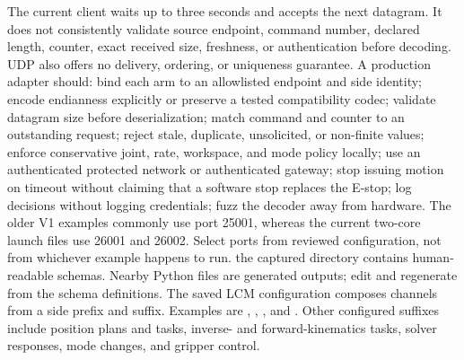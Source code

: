 {}The current client waits up to three seconds and accepts the next datagram. It does not consistently validate source endpoint, command number, declared length, counter, exact received size, freshness, or authentication before decoding. UDP also offers no delivery, ordering, or uniqueness guarantee.\markdownRendererParagraphSeparator
{}A production adapter should:\markdownRendererInterblockSeparator
{}\markdownRendererOlBegin
{}bind each arm to an allowlisted endpoint and side identity;\markdownRendererOlItemEnd 
{}encode endianness explicitly or preserve a tested compatibility codec;\markdownRendererOlItemEnd 
{}validate datagram size before deserialization;\markdownRendererOlItemEnd 
{}match command and counter to an outstanding request;\markdownRendererOlItemEnd 
{}reject stale, duplicate, unsolicited, or non-finite values;\markdownRendererOlItemEnd 
{}enforce conservative joint, rate, workspace, and mode policy locally;\markdownRendererOlItemEnd 
{}use an authenticated protected network or authenticated gateway;\markdownRendererOlItemEnd 
{}stop issuing motion on timeout without claiming that a software stop replaces the E-stop;\markdownRendererOlItemEnd 
{}log decisions without logging credentials;\markdownRendererOlItemEnd 
{}fuzz the decoder away from hardware.\markdownRendererOlItemEnd 
\markdownRendererOlEnd \markdownRendererInterblockSeparator
{}The older V1 examples commonly use port 25001, whereas the current two-core launch files use 26001 and 26002. Select ports from reviewed configuration, not from whichever example happens to run.\markdownRendererInterblockSeparator
{}
\markdownRendererSectionEnd 
\markdownRendererSectionEnd \markdownRendererSectionBegin
{}\markdownRendererInterblockSeparator
{}\markdownRendererBlockQuoteBegin
{} the captured  directory contains human-readable  schemas. Nearby  Python files are generated outputs; edit and regenerate from the schema definitions.\markdownRendererBlockQuoteEnd \markdownRendererInterblockSeparator
{}The saved LCM configuration composes channels from a side prefix and suffix. Examples are , , , and . Other configured suffixes include position plans and tasks, inverse- and forward-kinematics tasks, solver responses, mode changes, and gripper control.\markdownRendererParagraphSeparator
